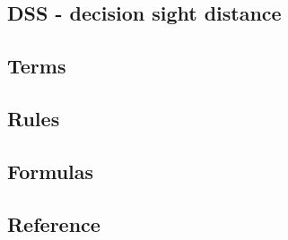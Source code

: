 \documentclass{article}
\begin{document}
  \subsection{DSS - decision sight distance}



  \subsection{Terms}

  \subsection{Rules}

  \subsection{Formulas}

  \subsection{Reference}


\end{document}
